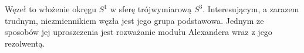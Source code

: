 \documentclass{article}
\begin{document}
Węzeł to włożenie okręgu $S^1$ w sferę trójwymiarową $S^3$. Interesującym, a zarazem trudnym, niezmiennikiem węzła jest jego grupa podstawowa. Jednym ze sposobów jej uproszczenia jest rozważanie modułu Alexandera wraz z jego rezolwentą.
\end{document}
